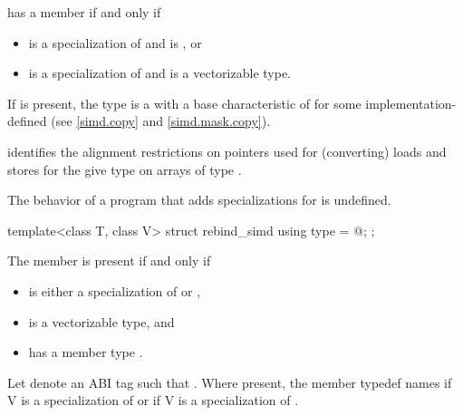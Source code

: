 \begin{itemdescr}
\pnum
{} has a member  if and only if
\begin{itemize}
  \item {} is a specialization of  and  is , or
  \item {} is a specialization of  and  is a vectorizable type.
\end{itemize}

\pnum
If  is present, the type  is a  with a base characteristic of  for some implementation-defined  (see \ref{simd.copy} and \ref{simd.mask.copy}). \begin{note} identifies the alignment restrictions on pointers used for (converting) loads and stores for the give type  on arrays of type .\end{note}

\pnum
The behavior of a program that adds specializations for  is undefined.
\end{itemdescr}

\begin{itemdecl}
template<class T, class V> struct rebind_simd { using type = @\seebelow@; };
\end{itemdecl}

\begin{itemdescr}
  \pnum
  The member  is present if and only if
  \begin{itemize}
    \item {} is either a specialization of  or
      ,
    \item {} is a vectorizable type, and
    \item {} has a member type .
  \end{itemize}

  \pnum
  Let  denote an ABI tag such that .
  Where present, the member typedef  names  if \tcode V is a specialization of  or
   if \tcode V is a specialization of
  .
\end{itemdescr}

